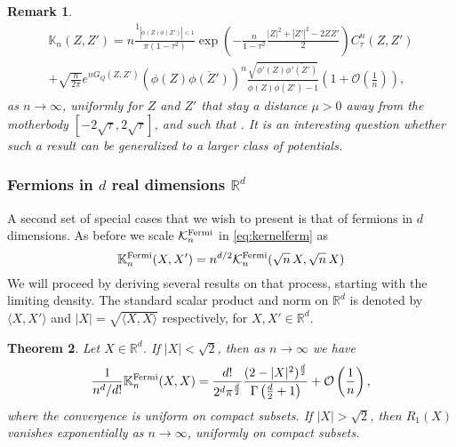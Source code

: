 \documentclass[%
 jmp,
cp,  %
 amsmath,amsthm,amssymb,%
 reprint,%
onecolumn]{revtex4-2}
\newtheorem{theorem}{Theorem}[section]
\newtheorem{remark}[theorem]{Remark}
\begin{document}
\begin{remark}
\begin{multline*}
\mathbb K_n(Z,Z') = 
 n\frac{\mathfrak{1}_{|\phi(Z) \overline{\phi(Z')}|<1}}{\pi (1-\tau^2)}
   \exp\left(-\frac{n}{1-\tau^2}\frac{|Z|^2+|Z'|^2-2 Z \overline{Z'}}{2}\right)C_{\tau}^n(Z,Z')
 \\
+ \sqrt{\frac{n}{2\pi}} e^{n G_Q(Z,Z')} 
\left(\phi(Z) \overline{\phi(Z')}\right)^n
\frac{\sqrt{\phi'(Z) \overline{\phi'(Z')}}}{\phi(Z) \overline{\phi(Z')} -1}
\left(1+\mathcal O\left(\frac{1}{n}\right)\right),
\end{multline*}
as $n\to\infty$, uniformly for $Z$ and $Z'$ that stay a distance $\mu>0$ away from the motherbody $[-2\sqrt\tau, 2\sqrt\tau]$, and such that . It is an interesting question whether such a result can be generalized to a larger class of potentials. \end{remark}



\subsubsection{Fermions in $d$ real dimensions $\mathbb{R}^d$}
A second set of special cases that we wish to present is that of fermions in $d$ dimensions. As before we scale $\mathcal K_n^{\rm Fermi}$ in \eqref{eq:kernelferm} as
$$
   \mathbb K_n^{\rm Fermi}(X,X')=n^{d/2} \mathcal K_n^{\rm Fermi}(\sqrt{n}\, X,\sqrt{n}\, X)
$$
We will proceed by deriving several results on that process, starting with the limiting density. 
The standard scalar product and norm on $\mathbb{R}^d$ is denoted by $\langle X,X'\rangle$ and $\lvert X \rvert=\sqrt{\langle X,X\rangle}$ respectively, for $X,X'\in\mathbb{R}^d$.

\begin{theorem} \label{thm:fermionsBulkDensity_intro}
    Let $X\in\mathbb R^d$. If $\lvert X\rvert < \sqrt 2$, then as $n\to\infty$ we have 
    \begin{align} \label{eq:fermionsBulkDensity1_intro}
    \frac{1}{n^d/d!} \mathbb K_n^{\rm Fermi} (X,X) =  \frac{d!}{2^d \pi^\frac{d}{2}} \frac{(2-\lvert X \rvert^2)^\frac{d}{2}}{\Gamma\left(\frac{d}{2}+1\right)} 
    +\mathcal O\left(\frac{1}{n}\right),
    \end{align}
    where the convergence is uniform on compact subsets.    
    If $\lvert X\rvert >\sqrt 2$, then $R_1(X)$ vanishes exponentially as $n\to\infty$, uniformly on compact subsets. 
    \end{theorem} 
\end{document}
